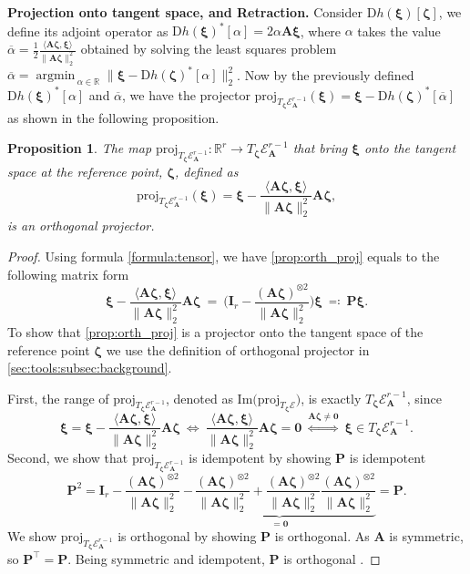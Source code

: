 \documentclass[sn-mathphys-num]{sn-jnl}
\DeclareMathOperator*{\argmin}{\textrm{argmin}\,} %
\def\proj            {\textrm{proj}}     %
\def\zeros           {\bm{0}}            %
\def\IR  {\mathbb{R}} 	    %
\def\IRr {\IR^{r}} 			%
\def\A {\bm{A}}
\def\I {\bm{I}}
\def\P {\bm{P}}
\def\cE { \mathcal{E}}
\def\bzeta    {\boldsymbol{\zeta}}
\def\bxi      {\boldsymbol{\xi}}
\newtheorem{proposition}[theorem]{Proposition}
\begin{document}
\noindent\textbf{Projection onto tangent space, and Retraction.}
Consider $\textrm{D}h(\bxi)[\bzeta]$, we define its adjoint operator as $\textrm{D}h(\bxi)^*[{\alpha}]=2{\alpha}\A\bxi$, 
where $\alpha$ takes the value $\overline{\alpha}= \frac{1}{2}\frac{\langle\A\bzeta,\bxi\rangle}{\|\A\bzeta\|_2^2}$ obtained by solving the least squares problem $\overline{\alpha} =  \displaystyle \argmin_{\alpha\in\IR}{\big\| \bxi-\textrm{D}h(\bzeta)^*[\alpha] \big\|_2^2}$.
Now by the previously defined $\textrm{D}h(\bxi)^*[{\alpha}]$ and $\overline{\alpha}$, 
we have the projector 
$
\proj_{T_{\bzeta}\cE_{\A}^{r-1}}(\bxi)
=
\bxi-\textrm{D}h(\bzeta)^*[\overline{\alpha}]
$ 
as shown in the following proposition.
\\

\begin{proposition}\label{prop:projTE_h}
The map $\proj_{T_{\bzeta}\cE_{\A}^{r-1}}:\IRr\rightarrow T_{\bzeta}\cE_{\A}^{r-1}$ that 
bring $\bxi$ onto the tangent space at the reference point, $\bzeta$, defined as 
\begin{equation}\label{prop:orth_proj}
\proj_{T_{\bzeta}\cE_{\A}^{r-1}}(\bxi)
=
\bxi-\dfrac{\langle\A\bzeta,\bxi\rangle}{\|\A\bzeta\|_2^2}\A\bzeta,
\tag{proj-ellips}
\end{equation}
is an orthogonal projector.
\end{proposition}
\begin{proof}
Using formula \eqref{formula:tensor}, we have \eqref{prop:orth_proj} equals to the following matrix form
\[
\bxi-\dfrac{\langle\A\bzeta,\bxi\rangle}{\|\A\bzeta\|_2^2}\A\bzeta 
~=~
\bigg(
\I_r-
\dfrac{(\A\bzeta)^{\otimes 2}}{\|\A\bzeta\|_2^2}
\bigg)\bxi
~\eqqcolon~ \P \bxi
.
\]
To show that \eqref{prop:orth_proj} is a projector onto the tangent space of the reference point $\bzeta$ we use the definition of orthogonal projector in \textsection\ref{sec:tools:subsec:background}.

First, the range of $\proj_{T_{\bzeta}\cE_{\A}^{r-1}}$, denoted as
$\textrm{Im}\big(
    \proj_{T_{\bzeta}\cE} 
    \big)$, is exactly $T_{\bzeta}\cE_{\A}^{r-1}$, since
\[      
\bxi = 
\bxi-\dfrac{\langle\A\bzeta,\bxi\rangle}{\|\A\bzeta\|_2^2}\A\bzeta 
~\iff~
    \dfrac{\langle\A\bzeta,\bxi\rangle}  {\|\A\bzeta\|_2^2}  \A\bzeta
    = 
    \zeros
~\overset{\A\bzeta\neq\zeros}{\iff}~
\bxi \in T_{\bzeta}\cE_{\A}^{r-1}
.
\]
Second, we show that $\proj_{T_{\bzeta}\cE_{\A}^{r-1}}$ is idempotent by showing $\P$ is idempotent
\[
\P^2
=
\I_r
- \dfrac{(\A\bzeta)^{\otimes 2}}{\|\A\bzeta\|_2^2}
~ \underbrace{-\, \dfrac{(\A\bzeta)^{\otimes 2}}{\|\A\bzeta\|_2^2}
+ 
\dfrac{(\A\bzeta)^{\otimes 2}}{\|\A\bzeta\|_2^2} \dfrac{(\A\bzeta)^{\otimes 2}}{\|\A\bzeta\|_2^2}
}_{=\zeros}
= \P.
\]
We show $\proj_{T_{\bzeta}\cE_{\A}^{r-1}}$ is orthogonal by showing $\P$ is orthogonal.
As $\A$ is symmetric, so $\P^\top = \P$.
Being symmetric and idempotent, $\P$ is orthogonal \cite[.13]{horn2012matrix}.
\end{proof}
\end{document}
